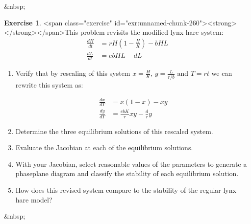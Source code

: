 \documentclass[
]{book}
\theoremstyle{definition}
\theoremstyle{definition}
\theoremstyle{definition}
\newtheorem{exercise}{Exercise}[chapter]
\theoremstyle{remark}
\begin{document}
&nbsp;

\begin{exercise}
<span class="exercise" id="exr:unnamed-chunk-260"><strong>\label{exr:unnamed-chunk-260} </strong></span>This problem revisits the modified lynx-hare system:
\begin{equation}
\begin{split}
\frac{dH}{dt} &= r H \left( 1- \frac{H}{K} \right) - b HL \\
\frac{dL}{dt} &=ebHL -dL
\end{split}
\end{equation}

\begin{enumerate}[label=\alph*.]
\item Verify that by rescaling of this system $\displaystyle x=\frac{H}{K}$, $\displaystyle y=\frac{L}{r/b}$ and $T = r t$ we can rewrite this system as:

\begin{equation}
\begin{split}
\frac{dx}{d T} &= x(1-x) - xy \\
\frac{dy}{d T} &=\frac{ebK}{r}xy -\frac{d}{r}y
\end{split}
\end{equation}

\item Determine the three equilibrium solutions of this rescaled system.
\item Evaluate the Jacobian at each of the equilibrium solutions.
\item With your Jacobian, select reasonable values of the parameters to generate a phaseplane diagram and classify the stability of each equilibrium solution.
\item How does this revised system compare to the stability of the regular lynx-hare model?
  \end{enumerate}
\end{exercise}

&nbsp;
\end{document}
